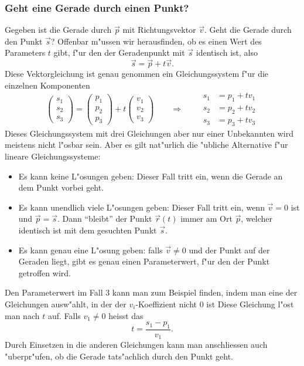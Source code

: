 \subsubsection{Geht eine Gerade durch einen Punkt?}
Gegeben ist die Gerade durch $\vec p$ mit Richtungsvektor $\vec v$. Geht die
Gerade durch den Punkt $\vec s$? Offenbar m"ussen wir herausfinden, ob es
einen Wert des Parameters $t$ gibt, f"ur den der Geradenpunkt mit $\vec s$
identisch ist, also
\[
\vec s = \vec p + t\vec v.
\]
Diese Vektorgleichung ist genau genommen ein Gleichungssystem f"ur die einzelnen
Komponenten
\[
\begin{pmatrix}
s_1\\s_2\\s_3
\end{pmatrix}
=
\begin{pmatrix}
p_1\\p_2\\p_3
\end{pmatrix}
+t
\begin{pmatrix}
v_1\\v_2\\v_3
\end{pmatrix}
\qquad
\Rightarrow
\qquad
\begin{aligned}
s_1&=p_1+tv_1\\
s_2&=p_2+tv_2\\
s_3&=p_3+tv_3
\end{aligned}
\]
Dieses Gleichungssystem mit drei Gleichungen aber nur einer Unbekannten wird
meistens nicht l"osbar sein. Aber es gilt nat"urlich die "ubliche Alternative
f"ur lineare Gleichungssysteme:
\begin{itemize}
\item Es kann keine L"osungen geben: Dieser Fall tritt ein, wenn die Gerade
an dem Punkt vorbei geht.
\item Es kann unendlich viele L"osungen geben: Dieser Fall tritt ein, wenn
$\vec v=0$ ist und $\vec p=\vec s$. Dann ``bleibt'' der Punkt $\vec r(t)$
immer am Ort $\vec p$, welcher identisch ist mit dem gesuchten Punkt $\vec s$.
\item Es kann genau eine L"osung geben: falls $\vec v\ne 0$ und der Punkt auf der
Geraden liegt, gibt es genau einen Parameterwert, f"ur den der Punkt
getroffen wird.
\end{itemize}
Den Parameterwert im Fall 3 kann man zum Beispiel finden, indem man eine
der Gleichungen ausw"ahlt, in der der $v_i$-Koeffizient nicht $0$ ist
Diese Gleichung l"ost man nach $t$ auf. Falls $v_1\ne 0$ heisst das
\[
t=\frac{s_1-p_1}{v_1}.
\]
Durch Einsetzen in die anderen Gleichungen kann man anschliessen auch "uberpr"ufen,
ob die Gerade tats"achlich durch den Punkt geht.

